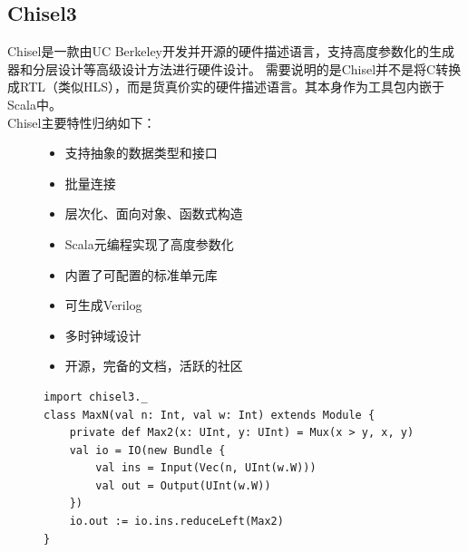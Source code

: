     \subsection{Chisel3}
        Chisel是一款由UC Berkeley开发并开源的硬件描述语言，支持高度参数化的生成器和分层设计等高级设计方法进行硬件设计。
        需要说明的是Chisel并不是将C转换成RTL（类似HLS），而是货真价实的硬件描述语言。其本身作为工具包内嵌于Scala中。 \\
        Chisel主要特性归纳如下：
        \begin{figure}[h]
            \begin{itemize}[topsep = 0 pt]
                \setlength{\topsep}{0pt}
                \setlength{\itemsep}{0pt}
                \setlength{\parsep}{0pt}
                \setlength{\parskip}{0pt}
                \setlength{\partopsep}{0pt}
                \item 支持抽象的数据类型和接口
                \item 批量连接
                \item 层次化、面向对象、函数式构造
                \item Scala元编程实现了高度参数化
                \item 内置了可配置的标准单元库
                \item 可生成Verilog
                \item 多时钟域设计
                \item 开源，完备的文档，活跃的社区
            \end{itemize}
        \end{figure}
        \begin{figure}[h]
            \label{chisel_example}
            \begin{lstlisting}[title=Chisel Example, frame=shadowbox]
import chisel3._
class MaxN(val n: Int, val w: Int) extends Module {
    private def Max2(x: UInt, y: UInt) = Mux(x > y, x, y)
    val io = IO(new Bundle {
        val ins = Input(Vec(n, UInt(w.W)))
        val out = Output(UInt(w.W))
    })
    io.out := io.ins.reduceLeft(Max2)
}
            \end{lstlisting}
        \end{figure}

